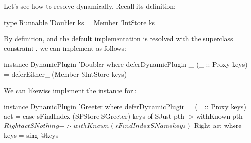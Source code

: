 \documentclass[demotion-paper.tex]{subfiles}
\begin{document}
Let's see how to resolve  dynamically.
Recall its definition:
\begin{code}
type Runnable 'Doubler ks = Member 'IntStore ks
\end{code}
By definition,  and the default implementation is resolved with the superclass constraint .
we can implement  as follows:
\begin{code}
instance DynamicPlugin 'Doubler where
  deferDynamicPlugin _ (_ :: Proxy keys) =
    deferEither_ (Member SIntStore keys)
\end{code}
We can likewise implement the instance for :
\begin{code}
instance DynamicPlugin 'Greeter where
 deferDynamicPlugin _ (_ :: Proxy keys) act =
  case sFindIndex (SPStore SGreeter) keys of
   SJust pth -> withKnown pth $ Right act
   SNothing -> withKnown (sFindIndex SName keys)
            $ Right act
  where keys = sing @keys
\end{code}
\end{document}
